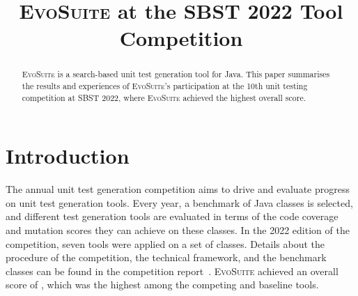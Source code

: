 \documentclass[10pt,conference]{IEEEtran}
\newcommand{\andrea}[1]{\textcolor{ScarletRed}{\sf\small\textbf{Andrea:} #1}}
\newcommand{\EVOSUITE}{\textsc{EvoSuite}\xspace}
\begin{document}
% 

\title{\EVOSUITE at the SBST 2022 Tool Competition}
 

\author{%
%
%
%
}

\maketitle

\begin{abstract}
  \EVOSUITE is a search-based unit test generation tool for Java. This paper summarises the results and experiences of \EVOSUITE's participation at the 10th unit testing competition at SBST 2022, where \EVOSUITE achieved the highest overall score.
\end{abstract}



\section{Introduction}
%
The annual unit test generation competition aims to drive and evaluate progress
on unit test generation tools. Every year, a benchmark of Java classes is
selected, and different test generation tools are evaluated in terms of the
code coverage and mutation scores they can achieve on these classes. In the
2022 edition of the competition, seven tools were applied on a set of \cuts classes.
Details about the procedure of the competition, the technical framework, and
the benchmark classes can be found in the competition report~\cite{SBST-toolcomp22}.
\EVOSUITE achieved an overall score of \score, which was the highest among the
competing and baseline tools.
\end{document}
